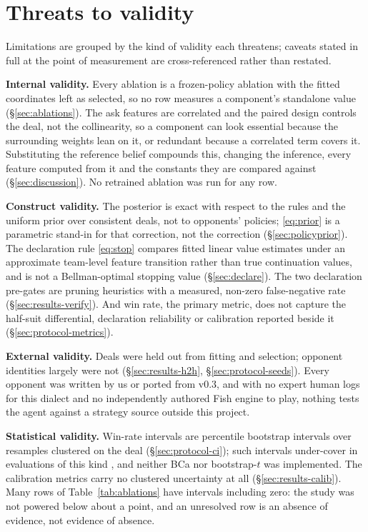 \section{Threats to validity}
\label{sec:limitations}

Limitations are grouped by the kind of validity each threatens; caveats stated
in full at the point of measurement are cross-referenced rather than restated.

\textbf{Internal validity.} Every ablation is a frozen-policy ablation with the
\numParams{} fitted coordinates left as selected, so no row measures a
component's standalone value (\S\ref{sec:ablations}). The \numAskFeats{} ask
features are correlated and the paired design controls the deal, not the
collinearity, so a component can look essential because the surrounding weights
lean on it, or redundant because a correlated term covers it.
Substituting the reference belief compounds this, changing the inference, every
feature computed from it and the constants they are compared against
(\S\ref{sec:discussion}). No retrained ablation was run for any row.

\textbf{Construct validity.} The posterior is exact with respect to the rules
and the uniform prior over consistent deals, not to opponents' policies;
\eqref{eq:prior} is a parametric stand-in for that correction, not the correction
(\S\ref{sec:policyprior}). The declaration rule \eqref{eq:stop} compares fitted
linear value estimates under an approximate team-level feature transition rather
than true continuation values, and is not a Bellman-optimal stopping value
(\S\ref{sec:declare}). The two declaration
pre-gates are pruning heuristics with a measured, non-zero false-negative rate
(\S\ref{sec:results-verify}). And win rate, the primary metric, does not capture
the half-suit differential, declaration reliability or calibration reported
beside it (\S\ref{sec:protocol-metrics}).

\textbf{External validity.} Deals were held out from fitting and selection;
opponent identities largely were not (\S\ref{sec:results-h2h},
\S\ref{sec:protocol-seeds}). Every opponent was written by us or ported from
v0.3, and with no expert human logs for this dialect and no independently
authored Fish engine to play, nothing tests the agent against a strategy source
outside this project.

\textbf{Statistical validity.} Win-rate intervals are percentile bootstrap
intervals over \numBootstrapDraws{} resamples clustered on the deal
(\S\ref{sec:protocol-ci}); such intervals under-cover in evaluations of this
kind \cite{jordan-rleval}, and neither BCa nor bootstrap-$t$ was implemented.
The calibration metrics carry no clustered uncertainty at all
(\S\ref{sec:results-calib}). Many rows of Table~\ref{tab:ablations} have
intervals including zero: the study was not powered below about a point, and an
unresolved row is an absence of evidence, not evidence of absence.

